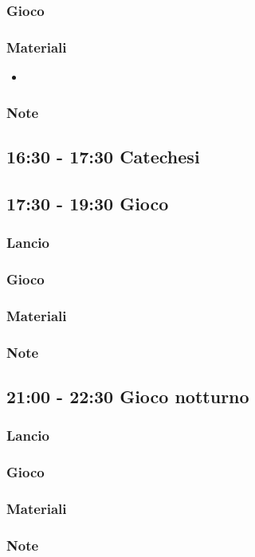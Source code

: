 \documentclass[../main.tex]{subfiles}
\begin{document}
        \subsubsection{Gioco}
        \subsubsection{Materiali}
        \begin{itemize}
           \item
           \end{itemize}
       \subsubsection{Note}
    \subsection{16:30 - 17:30 Catechesi}   
    \subsection{17:30 - 19:30 Gioco}
        \subsubsection{Lancio}
        \subsubsection{Gioco}
        \subsubsection{Materiali}
        \subsubsection{Note}
        
    \subsection{21:00 - 22:30 Gioco notturno}
        \subsubsection{Lancio}
        \subsubsection{Gioco}
        \subsubsection{Materiali}
        \subsubsection{Note}
   
\end{document}
